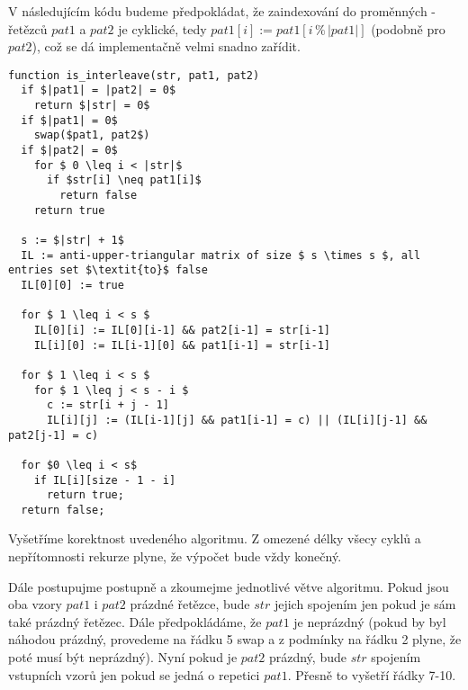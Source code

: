 \documentclass[12pt,a4paper]{article}
\theoremstyle{plain}
\newcommand\addfunctions[1]{%
  \lstset{morekeywords=[4]{#1}}}
\begin{document}
\pagestyle{fancy}                      %
\fancyhf{}                             %
\addtolength{\topmargin}{-30 pt}                   %
\setlength{\headsep}{10 pt}                      %
\renewcommand{\headrulewidth}{1 pt}                %

\addfunctions{is_interleave}

V následujícím kódu budeme předpokládat, že zaindexování do proměnných - řetězců $pat1 $ a $ pat2 $ je cyklické, tedy $ pat1[i] := pat1[i \operatorname{\%} |pat1|] $ (podobně pro $pat2$), což se dá implementačně velmi snadno zařídit.


\begin{lstlisting}[mathescape]
function is_interleave(str, pat1, pat2)
  if $|pat1| = |pat2| = 0$
    return $|str| = 0$
  if $|pat1| = 0$
    swap($pat1, pat2$)
  if $|pat2| = 0$
    for $ 0 \leq i < |str|$
      if $str[i] \neq pat1[i]$
        return false
    return true
    
  s := $|str| + 1$
  IL := anti-upper-triangular matrix of size $ s \times s $, all entries set $\textit{to}$ false
  IL[0][0] := true
  
  for $ 1 \leq i < s $
    IL[0][i] := IL[0][i-1] && pat2[i-1] = str[i-1]
    IL[i][0] := IL[i-1][0] && pat1[i-1] = str[i-1]
    
  for $ 1 \leq i < s $ 
    for $ 1 \leq j < s - i $ 
      c := str[i + j - 1]
      IL[i][j] := (IL[i-1][j] && pat1[i-1] = c) || (IL[i][j-1] && pat2[j-1] = c)
      
  for $0 \leq i < s$
    if IL[i][size - 1 - i]
      return true;
  return false;
\end{lstlisting}

Vyšetříme korektnost uvedeného algoritmu. Z omezené délky všecy cyklů a nepřítomnosti rekurze plyne, že výpočet bude vždy konečný.

Dále postupujme postupně a zkoumejme jednotlivé větve algoritmu. Pokud jsou oba vzory $ pat1 $ i $ pat2 $ prázdné řetězce, bude $ str $ jejich spojením jen pokud je sám také prázdný řetězec. Dále předpokládáme, že $ pat1 $ je neprázdný (pokud by byl náhodou prázdný, provedeme na řádku 5 swap a z podmínky na řádku 2 plyne, že poté musí být neprázdný). Nyní pokud je $ pat2 $ prázdný, bude $ str $ spojením vstupních vzorů jen pokud se jedná o repetici $ pat1 $. Přesně to vyšetří řádky 7-10. 
\end{document}
